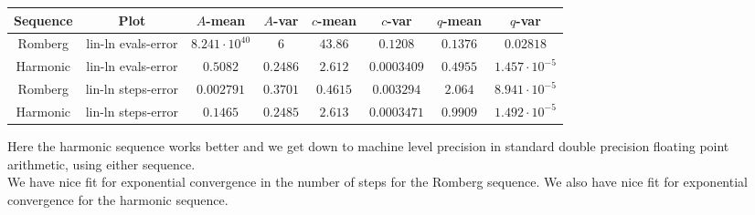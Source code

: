 \begin{table}[H]
    \centering
    \small
     \begin{tabular}{c|c||c|c|c|c|c|c}
Sequence & Plot & \(A\)-mean & \(A\)-var & \(c\)-mean & \(c\)-var & \(q\)-mean & \(q\)-var\\\hline
Romberg & lin-ln evals-error & \(8.241\cdot 10^{40}\) & \(6\) & \(43.86\) & \(0.1208\) & \(0.1376\) & \(0.02818\) \\
Harmonic & lin-ln evals-error & \(0.5082\) & \(0.2486\) & \(2.612\) & \(0.0003409\) & \(0.4955\) & \(1.457\cdot 10^{-5}\) \\
Romberg & lin-ln steps-error & \(0.002791\) & \(0.3701\) & \(0.4615\) & \(0.003294\) & \(2.064\) & \(8.941\cdot 10^{-5}\) \\
Harmonic & lin-ln steps-error & \(0.1465\) & \(0.2485\) & \(2.613\) & \(0.0003471\) & \(0.9909\) & \(1.492\cdot 10^{-5}\) \\
    \end{tabular}
    \label{tab:my_label}
\end{table}

Here the harmonic sequence works better and we get down to machine level precision in standard double precision floating point arithmetic, using either sequence.\\

We have nice fit for exponential convergence in the number of steps for the Romberg sequence. We also have nice fit for exponential convergence for the harmonic sequence.

